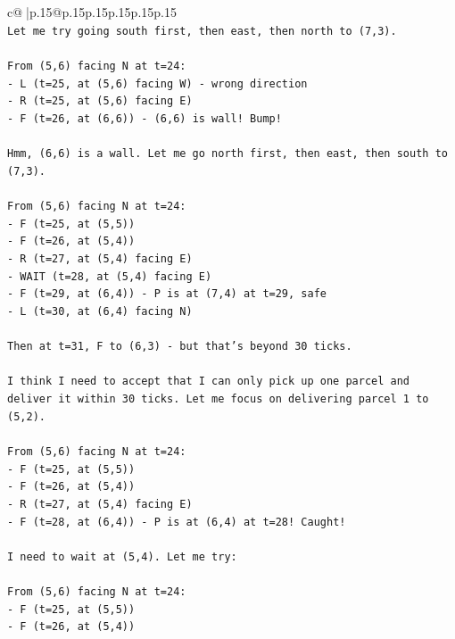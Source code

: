 \documentclass{article}
\begin{document}
{\begin{supertabular}{c@{$\;$}|p{.15\linewidth}@{}p{.15\linewidth}p{.15\linewidth}p{.15\linewidth}p{.15\linewidth}p{.15\linewidth}}
{{{\\ 
\texttt{Let me try going south first, then east, then north to (7,3).} \\
\\ 
\texttt{From (5,6) facing N at t=24:} \\
\texttt{{-} L (t=25, at (5,6) facing W) {-} wrong direction} \\
\texttt{{-} R (t=25, at (5,6) facing E)} \\
\texttt{{-} F (t=26, at (6,6)) {-} (6,6) is wall! Bump!} \\
\\ 
\texttt{Hmm, (6,6) is a wall. Let me go north first, then east, then south to (7,3).} \\
\\ 
\texttt{From (5,6) facing N at t=24:} \\
\texttt{{-} F (t=25, at (5,5))} \\
\texttt{{-} F (t=26, at (5,4))} \\
\texttt{{-} R (t=27, at (5,4) facing E)} \\
\texttt{{-} WAIT (t=28, at (5,4) facing E)} \\
\texttt{{-} F (t=29, at (6,4)) {-} P is at (7,4) at t=29, safe} \\
\texttt{{-} L (t=30, at (6,4) facing N)} \\
\\ 
\texttt{Then at t=31, F to (6,3) {-} but that's beyond 30 ticks.} \\
\\ 
\texttt{I think I need to accept that I can only pick up one parcel and deliver it within 30 ticks. Let me focus on delivering parcel 1 to (5,2).} \\
\\ 
\texttt{From (5,6) facing N at t=24:} \\
\texttt{{-} F (t=25, at (5,5))} \\
\texttt{{-} F (t=26, at (5,4))} \\
\texttt{{-} R (t=27, at (5,4) facing E)} \\
\texttt{{-} F (t=28, at (6,4)) {-} P is at (6,4) at t=28! Caught!} \\
\\ 
\texttt{I need to wait at (5,4). Let me try:} \\
\\ 
\texttt{From (5,6) facing N at t=24:} \\
\texttt{{-} F (t=25, at (5,5))} \\
\texttt{{-} F (t=26, at (5,4))} \\
}}}
\end{supertabular}}
\end{document}
